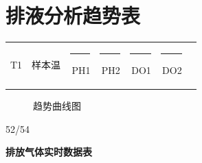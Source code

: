\documentclass[UTF8,10pt,a4paper,fontset=fandol]{ctexart}
\begin{document}
\newpage

\section*{排液分析趋势表}

\begin{center}
\begin{tabular}{@{}lllllll@{}}
T1 &
样本温 &
\textcolor{red}{\rule{1em}{1em}}\,PH1 &
\textcolor{green}{\rule{1em}{1em}}\,PH2 &
\textcolor{yellow}{\rule{1em}{1em}}\,DO1 &
\textcolor{blue}{\rule{1em}{1em}}\,DO2
\end{tabular}
\end{center}

\begin{figure}[h]
\centering
{}
\caption*{趋势曲线图}
\end{figure}

\newpage

\begin{figure}[htbp]
    \centering
\end{figure}

\begin{flushright}
52/54
\end{flushright}

\newpage

\begin{center}
\textbf{排放气体实时数据表}
\end{center}
\end{document}
